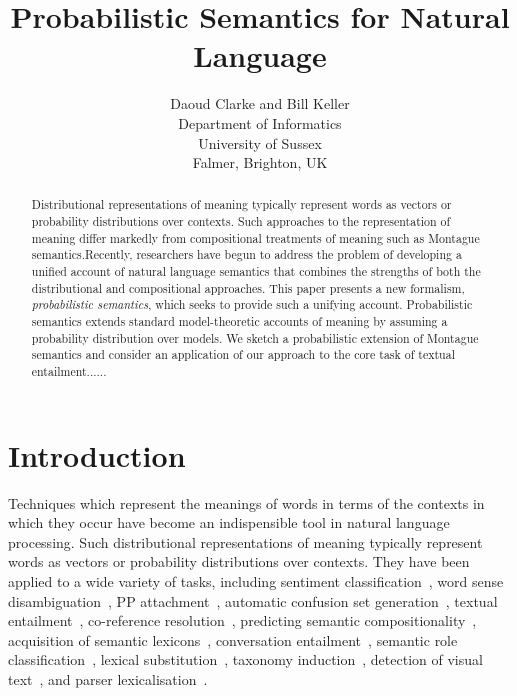 \documentclass[letterpaper]{article}
\begin{document}
%
\title{Probabilistic Semantics for Natural Language}
\author{Daoud Clarke and Bill Keller\\
Department of Informatics\\
University of Sussex\\
Falmer, Brighton, UK\\
}
\maketitle
\begin{abstract}
Distributional representations of meaning typically
represent words as vectors or probability distributions over
contexts. Such approaches to the representation of meaning differ markedly from compositional treatments of meaning
such as Montague semantics.Recently, researchers have begun to address the problem of  developing a unified account of natural language semantics that combines the strengths of both the distributional and compositional approaches. This paper presents a new formalism, {\em probabilistic semantics\/}, which seeks to provide such a unifying account. Probabilistic semantics extends standard model-theoretic
accounts of meaning by assuming a probability distribution over
models. We sketch a probabilistic extension of Montague semantics and consider an application of our approach to the core task of textual entailment......


\end{abstract}


\section{Introduction}

Techniques which represent the meanings of words in terms of the contexts in
which they occur have become an indispensible tool in natural language
processing. Such distributional representations of meaning typically
represent words as vectors or probability distributions over
contexts. They have been applied to a wide variety of tasks,
including sentiment classification~\cite{Bollegala2011}, word sense
disambiguation~\cite{miller-EtAl:2012:PAPERS,khapra-EtAl:2010:ACL}, PP
attachment~\cite{Calvo05distributionalthesaurus}, automatic confusion
set generation~\cite{xue-hwa:2012:PAPERS}, textual
entailment~\cite{berant-dagan-goldberger:2010:ACL}, co-reference
resolution~\cite{lee-EtAl:2012:EMNLP-CoNLL}, predicting semantic
compositionality~\cite{bergsma-EtAl:2010:EMNLP}, acquisition of
semantic lexicons~\cite{mcintosh:2010:EMNLP}, conversation
entailment~\cite{zhang-chai:2010:EMNLP}, semantic role
classification~\cite{zapirain-EtAl:2010:NAACLHLT}, lexical
substitution~\cite{szarvas-biemann-gurevych:2013:NAACL-HLT}, taxonomy
induction~\cite{fountain-lapata:2012:NAACL-HLT}, detection of visual
text~\cite{dodge-EtAl:2012:NAACL-HLT}, and parser
lexicalisation~\cite{rei-briscoe:2013:NAACL-HLT}.
\end{document}
